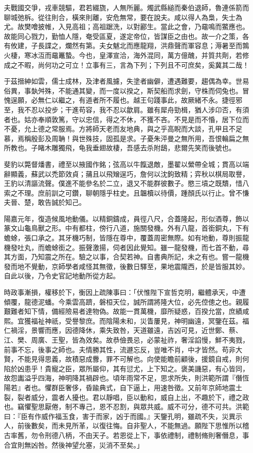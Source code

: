 \begin{pinyinscope}
夫戰國交爭，戎車競驅，君若綴旒，人無所麗。燭武縣縋而秦伯退師，魯連係箭而聊城弛柝。從往則合，橫來則離，安危無常，要在說夫。咸以得人為梟，失士為尤。故樊噲披帷，入見高祖；高祖踞洗，以對酈生。當此之會，乃黿鳴而鱉應也。故能同心戮力，勤恤人隱，奄受區夏，遂定帝位，皆謀臣之由也。故一介之策，各有攸建，子長諜之，爛然有第。夫女魃北而應龍翔，洪鼎聲而軍容息；溽暑至而鶉火棲，寒冰沍而黿鼉蟄。今也，皇澤宣洽，海外混同，萬方億醜，并質共劑，若修成之不暇，尚何功之可立！立事有三，言為下列；下列且不可庶矣，奚冀其二哉！

于茲搢紳如雲，儒士成林，及津者風攄，失塗者幽僻，遭遇難要，趨偶為幸。世易俗異，事埶舛殊，不能通其變，而一度以揆之，斯契船而求劍，守株而伺兔也。冒愧逞願，必無仁以繼之，有道者所不履也。越王句踐事此，故厥緒不永。捷徑邪至，我不忍以投步；干進苟容，我不忍以歙肩。雖有犀舟勁楫，猶人涉卬否，有須者也。姑亦奉順敦篤，守以忠信，得之不休，不獲不吝。不見是而不惛，居下位而不憂，允上德之常服焉。方將師天老而友地典，與之乎高睨而大談，孔甲且不足慕，焉稱殷彭及周聃！與世殊技，固孤是求。子憂朱泙曼之無所用，吾恨輪扁之無所教也。子睹木雕獨飛，龟我垂翅故棲，吾感去杀附鴟，悲爾先笑而後號也。

斐豹以斃督燔書，禮至以掖國作銘；弦高以牛餼退敵，墨翟以縈帶全城；貫高以端辭顯義，蘇武以禿節效貞；蒱且以飛矰逞巧，詹何以沈鉤致精；弈秋以棋局取譽，王豹以清謳流聲。僕進不能參名於二立，退又不能群彼數子。愍三墳之既穨，惜八索之不理。庶前訓之可鑽，聊朝隱乎柱史。且韞櫝以待價，踵顏氏以行止。曾不慊夫晉、楚，敢告誠於知己。

陽嘉元年，復造候風地動儀。以精銅鑄成，員徑八尺，合蓋隆起，形似酒尊，飾以篆文山龜鳥獸之形。中有都柱，傍行八道，施關發機。外有八龍，首銜銅丸，下有蟾蜍，張口承之。其牙機巧制，皆隱在尊中，覆蓋周密無際。如有地動，尊則振龍機發吐丸，而蟾蜍銜之。振聲激揚，伺者因此覺知。雖一龍發機，而七首不動，尋其方面，乃知震之所在。驗之以事，合契若神。自書典所記，未之有也。嘗一龍機發而地不覺動，京師學者咸怪其無徵，後數日驛至，果地震隴西，於是皆服其妙。自此以後，乃令史官記地動所從方起。

時政事漸損，權移於下，衡因上疏陳事曰：「伏惟陛下宣哲克明，繼體承天，中遭傾覆，龍德泥蟠。今乘雲高躋，磐桓天位，誠所謂將隆大位，必先倥傯之也。親履艱難者知下情，備經險易者達物偽。故能一貫萬機，靡所疑惑，百揆允當，庶績咸熙。宜獲福祉神祇，受譽黎庶。而陰陽未和，災眚屢見，神明幽遠，冥鑒在茲。福仁禍淫，景響而應，因德降休，乘失致咎，天道雖遠，吉凶可見，近世鄭、蔡、江、樊、周廣、王聖，皆為效矣。故恭儉畏忌，必蒙祉祚，奢淫諂慢，鮮不夷戮，前事不忘，後事之師也。夫情勝其性，流遯忘反，豈唯不肖，中才皆然。苟非大賢，不能見得思義，故積惡成釁，罪不可解也。向使能瞻前顧後，援鏡自戒，則何陷於凶患乎！貴寵之臣，眾所屬仰，其有愆尤，上下知之。褒美譏惡，有心皆同，故怨讟溢乎四海，神明降其禍辟也。頃年雨常不足，思求所失，則洪範所謂『僭恆陽若』者也。懼群臣奢侈，昏踰典式，自下逼上，用速咎徵。又前年京師地震土裂，裂者威分，震者人擾也。君以靜唱，臣以動和，威自上出，不趣於下，禮之政也。竊懼聖思厭倦，制不專己，恩不忍割，與眾共威。威不可分，德不可共。洪範曰：『臣有作威作福玉食，害于而家，凶于而國。』天鑒孔明，雖疏不失，災異示人，前後數矣，而未見所革，以復往悔。自非聖人，不能無過。願陛下思惟所以稽古率舊，勿令刑德八柄，不由天子。若恩從上下，事依禮制，禮制脩則奢僭息，事合宜則無凶咎。然後神望允塞，災消不至矣。」


\end{pinyinscope}

